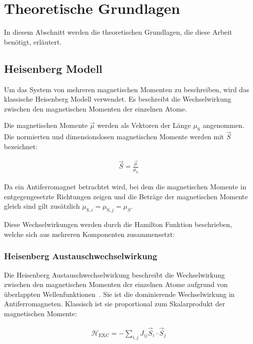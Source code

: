 \documentclass[main.tex]{subfiles}
\begin{document}
\section{Theoretische Grundlagen}

In diesem Abschnitt werden die theoretischen Grundlagen, die diese Arbeit
benötigt, erläutert.

\subsection{Heisenberg Modell}

Um das System von mehreren magnetischen Momenten zu beschreiben, wird das
klassische Heisenberg Modell verwendet. Es beschreibt die Wechselwirkung
zwischen den magnetischen Momenten der einzelnen Atome.

Die magnetischen Momente \(\vec{\mu}\) werden als Vektoren der Länge
\(\mu_{\text{S}}\) angenommen.
Die normierten und dimensionslosen magnetischen Momente werden mit \(\vec{S}\)
bezeichnet:

\begin{align}
	\vec{S} = \frac{\vec{\mu}}{\mu_{\text{S}}}
\end{align}

Da ein Antiferromagnet betrachtet wird, bei dem die magnetischen Momente in
entgegengesetzte Richtungen zeigen und die Beträge der magnetischen Momente
gleich sind gilt zusätzlich \(\mu_{\text{S},i} = \mu_{\text{S},j} = \mu_{S}\).

Diese Wechselwirkungen werden durch die Hamilton Funktion beschrieben, welche
sich aus mehreren Komponenten zusammensetzt:

\subsubsection*{Heisenberg Austauschwechselwirkung}

Die Heisenberg Austauschwechselwirkung beschreibt die Wechselwirkung zwischen
den magnetischen Momenten der einzelnen Atome aufgrund von überlappten
Wellenfunktionen~\cite{Heisenberg-Ferromagnetismus}. Sie ist die dominierende
Wechselwirkung in Antiferromagneten. Klassisch ist sie proportional zum
Skalarprodukt der magnetischen Momente:

\begin{align}
	\mathcal{H}_{\text{EXC}} = -\sum_{i,j} J_{ij} \vec{S}_i \cdot \vec{S}_j\label{eq:hamilton-heisenberg-exc}
\end{align}
\end{document}
